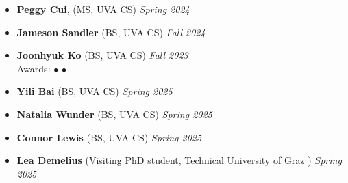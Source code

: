 \begin{itemize}
  \item  \textbf{Peggy Cui}, ({\sc MS, UVA} CS)  \hfill{\em Spring 2024}
  \item  \textbf{Jameson Sandler} ({\sc BS, UVA} CS)  \hfill{\em Fall 2024}
  \item  \textbf{Joonhyuk Ko} ({\sc BS, UVA} CS)  \hfill{\em Fall 2023}\\
  {\sc Awards:} 
    $\bullet$  
    $\bullet$ 
  \item \textbf{Yili Bai} ({\sc BS, UVA} CS)  \hfill{\em Spring 2025}
  \item \textbf{Natalia Wunder} ({\sc BS, UVA} CS)  \hfill{\em Spring 2025}
  \item \textbf{Connor Lewis} ({\sc BS, UVA} CS)  \hfill{\em Spring 2025}
\end{itemize}

\begin{itemize}
  \item  \textbf{Lea Demelius} ({\sc Visiting PhD student, Technical University of Graz })  \hfill{\em Spring 2025}
\end{itemize}


